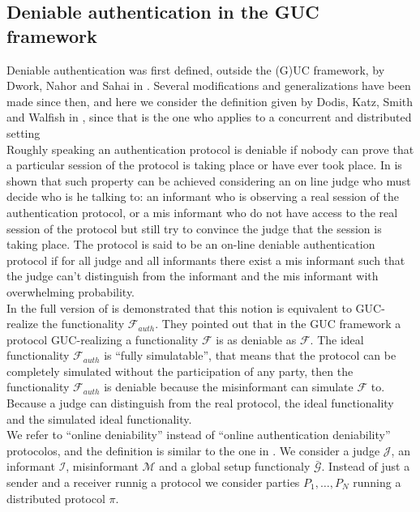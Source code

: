 \documentclass{acm_proc_article-sp}
\begin{document}
\subsection{Deniable authentication in the GUC framework}
Deniable authentication was first defined, outside the (G)UC framework, by Dwork, Nahor and Sahai in
\cite{DwoNaoSah04}. Several modifications and generalizations have been made since then, and here we consider
the definition given by Dodis, Katz, Smith and Walfish in \cite{conf/tcc/DodisKSW09}, since that is the one who
applies to a concurrent and distributed setting\\
Roughly speaking an authentication protocol is deniable if nobody can prove that a particular session of
the protocol is taking place or have ever took place. In \cite{conf/tcc/DodisKSW09} is shown that such property
can be achieved considering an on line judge who must decide who is he talking to: an informant who is observing
a real session of the authentication protocol, or a mis informant who do not have access to the real session of
the protocol but still try to convince the judge that the session is taking place. The protocol is said to be
an on-line deniable authentication protocol if for all judge and all informants there exist a mis informant such that
the judge can't distinguish from the informant and the mis informant with overwhelming probability.\\
In the
full version of \cite{conf/tcc/DodisKSW09} is demonstrated that this notion is equivalent to GUC-realize the
functionality $\mathcal{F}_{auth}$. They pointed out that in the GUC framework a protocol GUC-realizing
a functionality $\mathcal{F}$ is as deniable as $\mathcal{F}$. The ideal functionality $\mathcal{F}_{auth}$ is
``fully simulatable'', that means that the protocol can be completely simulated without the participation
of any party, then the functionality $\mathcal{F}_{auth}$ is deniable because the misinformant can simulate
$\mathcal{F}$ to. Because a judge can distinguish
from the real protocol, the ideal functionality and the simulated ideal functionality.\\
We refer to ``online deniability'' instead of ``online authentication deniability'' protocolos,
and the definition is similar to the one in \cite{conf/tcc/DodisKSW09}.
We consider a judge $\mathcal{J}$, an informant $\mathcal{I}$, misinformant $\mathcal{M}$ and a global
setup functionaly $\bar{\mathcal{G}}$. Instead of
just a sender and a receiver runnig a protocol we consider parties $P_1, \ldots, P_N$ running a
distributed protocol $\pi$.\\
\end{document}
